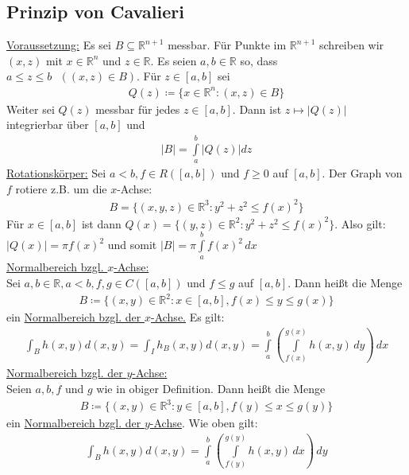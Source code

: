 \subsection{Prinzip von Cavalieri}
\label{sec: Cavalieri}
\underline{Voraussetzung:} Es sei $B \subseteq \mathbb{R}^{n+1}$ messbar. Für Punkte im $\mathbb{R}^{n+1}$ schreiben wir $(x,z)$ mit $x \in \mathbb{R}^n$ und $z \in \mathbb{R}$. 
Es seien $a,b \in \mathbb{R}$ so, dass $a \leq z \leq b \text{ } ((x,z) \in B)$. Für $z \in [a,b]$ sei 
\begin{align*}
    Q(z) \coloneqq \{ x \in \mathbb{R}^n: (x,z) \in B\}
\end{align*}
Weiter sei $Q(z)$ messbar für jedes $z \in [a,b]$. Dann ist $z \mapsto \lvert Q(z)\rvert$ integrierbar über $[a,b]$ und 
\begin{align*}
    \lvert B\rvert = \int \limits_a^b \lvert Q(z)\rvert dz
\end{align*}
\underline{Rotationskörper:} Sei $a < b, f \in R([a,b])$ und $f \geq 0$ auf $[a,b]$. Der Graph von $f$ rotiere z.B. um die $x$-Achse:
\begin{align*}
    B = \{ (x,y,z) \in \mathbb{R}^3: y^2+z^2 \leq f(x)^2\}
\end{align*}
Für $x \in [a,b]$ ist dann $Q(x) = \{ (y,z) \in \mathbb{R}^2: y^2+z^2\leq f(x)^2\}$. Also gilt: $\lvert Q(x) \rvert = \pi f(x)^2$ und somit $\lvert B \rvert = \pi \int \limits_a^b f(x)^2\,dx$ \\
\underline{Normalbereich bzgl. $x$-Achse:} \\
Sei $a,b \in \mathbb{R}, a < b, f,g \in C([a,b])$ und $f \leq g$ auf $[a,b]$. Dann heißt die Menge
\begin{align*}
    B \coloneqq \{ (x,y) \in \mathbb{R}^2: x \in [a,b], f(x) \leq y \leq g(x)\}
\end{align*}
ein \underline{Normalbereich bzgl. der $x$-Achse.} Es gilt:
\begin{align*}
    \int_B h(x,y) d(x,y) = \int_I h_B(x,y) d(x,y) = \int \limits_a^b (\int \limits_{f(x)}^{g(x)} h(x,y)\,dy)\,dx
\end{align*}
\underline{Normalbereich bzgl. der $y$-Achse:} \\
Seien $a,b,f$ und $g$ wie in obiger Definition. Dann heißt die Menge 
\begin{align*}
    B \coloneqq \{ (x,y) \in \mathbb{R}^3: y \in [a,b], f(y) \leq x \leq g(y)\}
\end{align*}
ein \underline{Normalbereich bzgl. der $y$-Achse}. Wie oben gilt:
\begin{align*}
    \int_B h(x,y) d(x,y) = \int \limits_a^b (\int \limits_{f(y)}^{g(y)} h(x,y)\,dx)\,dy
\end{align*}


